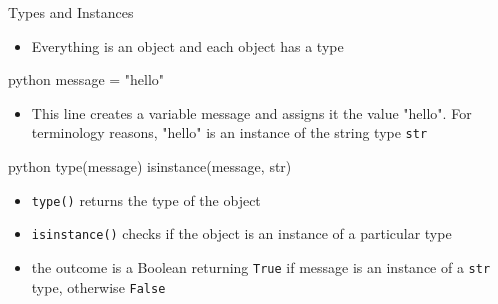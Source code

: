 \documentclass[
	11pt, 
]{beamer}
\begin{document}

\begin{frame}[fragile]{Types and Instances}

\begin{itemize}
    \item Everything is an object and each object has a type
\end{itemize}

\begin{mintedbox}{python}
message = "hello"
\end{mintedbox}

\begin{itemize}
    \item This line creates a variable message and assigns it the value "hello". For terminology reasons, "hello" is an instance of the string type \texttt{str}
\end{itemize}

\begin{mintedbox}{python}
type(message)
isinstance(message, str)
\end{mintedbox}

\begin{itemize}
    \item \texttt{type()} returns the type of the object
    \item \texttt{isinstance()} checks if the object is an instance of a particular type
    \item the outcome is a Boolean returning \texttt{True} if message is an instance of a \texttt{str} type, otherwise \texttt{False}
\end{itemize}


\end{frame}

\end{document}
